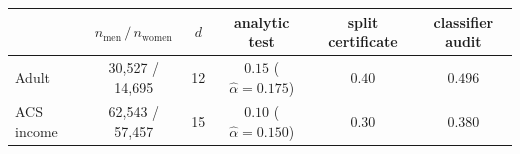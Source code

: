 \begin{tabular}{lccccc}
\toprule
& $n_{\mathrm{men}}\,/\,n_{\mathrm{women}}$ & $d$ & analytic test & split certificate & classifier audit \\
\midrule
Adult & 30{,}527 / 14{,}695 & 12 & $0.15$ ($\widehat\alpha=0.175$) & $0.40$ & $0.496$ \\
ACS income & 62{,}543 / 57{,}457 & 15 & $0.10$ ($\widehat\alpha=0.150$) & $0.30$ & $0.380$ \\
\bottomrule
\end{tabular}
